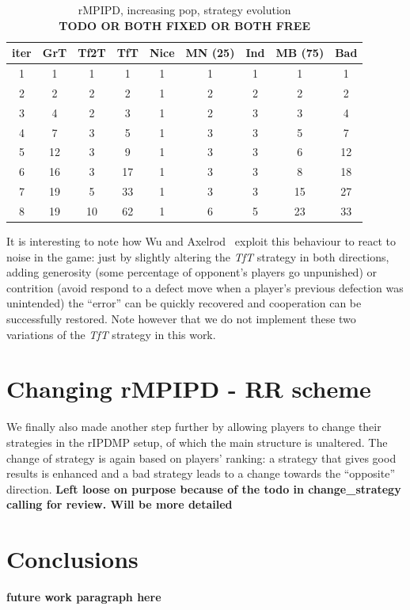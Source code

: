 \documentclass[journal,a4paper,10pt,twoside]{IEEEtran} %
\begin{document}
\begin{table}[ht]
    \caption{rMPIPD, increasing pop, strategy evolution\\ \textbf{TODO OR BOTH FIXED OR BOTH FREE}}
    \label{tab:ripdmp-const}
    \centering
    \begin{tabular}{c|cccccccc} \toprule
        iter & GrT & Tf2T & TfT & Nice & MN (25) & Ind & MB (75) & Bad \\ \midrule
        1 &   1 &   1 &   1 &  1 &  1 &  1 &   1 &   1 \\
        2 &   2 &   2 &   2 &  1 &  2 &  2 &   2 &   2 \\
        3 &   4 &   2 &   3 &  1 &  2 &  3 &   3 &   4 \\
        4 &   7 &   3 &   5 &  1 &  3 &  3 &   5 &   7 \\
        5 &  12 &   3 &   9 &  1 &  3 &  3 &   6 &  12 \\
        6 &  16 &   3 &  17 &  1 &  3 &  3 &   8 &  18 \\
        7 &  19 &   5 &  33 &  1 &  3 &  3 &  15 &  27 \\
        8 &  19 &  10 &  62 &  1 &  6 &  5 &  23 &  33 \\ \bottomrule
    \end{tabular}
\end{table}

It is interesting to note how Wu and Axelrod~\cite{IPDnoise} exploit this behaviour to react to noise in the game: just by slightly altering the \textit{TfT} strategy in both directions, adding generosity (some percentage of opponent's players go unpunished) or contrition (avoid respond to a defect move when a player's previous defection was unintended) the ``error'' can be quickly recovered and cooperation can be successfully restored. Note however that we do not implement these two variations of the \textit{TfT} strategy in this work.

\section{Changing rMPIPD - RR scheme} \label{s:crIPDMP}
We finally also made another step further by allowing players to change their strategies in the rIPDMP setup, of which the main structure is unaltered. The change of strategy is again based on players' ranking: a strategy that gives good results is enhanced and a bad strategy leads to a change towards the ``opposite'' direction.
\textbf{Left loose on purpose because of the todo in change_strategy calling for review. Will be more detailed}

\section{Conclusions} \label{s:conc}

\textbf{future work paragraph here}

\balance


\end{document}
